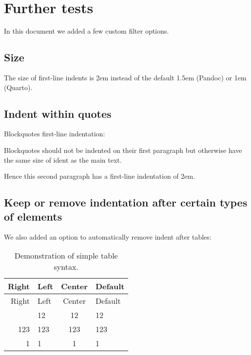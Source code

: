 \documentclass[
  letterpaper,
  DIV=11,
  numbers=noendperiod]{scrartcl}
\makeatletter
\renewenvironment{quote}
     {\list{}{\listparindent 1.5em%
              \itemindent \listparindent
              \rightmargin \leftmargin
              \parsep \z@ \@plus \p@}%
            \item\noindent\relax}
      {\endlist}
\makeatother
\begin{document}
\hypertarget{further-tests}{%
\section{Further tests}\label{further-tests}}

In this document we added a few custom filter options.

\hypertarget{size}{%
\subsection{Size}\label{size}}

The size of first-line indents is 2em instead of the default 1.5em
(Pandoc) or 1em (Quarto).

\hypertarget{indent-within-quotes}{%
\subsection{Indent within quotes}\label{indent-within-quotes}}

Blockquotes first-line indentation:

\begin{quote}
\noindent Blockquotes should not be indented on their first paragraph
but otherwise have the same size of ident as the main text.

Hence this second paragraph has a first-line indentation of 2em.
\end{quote}

\hypertarget{keep-or-remove-indentation-after-certain-types-of-elements}{%
\subsection{Keep or remove indentation after certain types of
elements}\label{keep-or-remove-indentation-after-certain-types-of-elements}}

We also added an option to automatically remove indent after tables:

\begin{longtable}[]{@{}rlcl@{}}
\caption{Demonstration of simple table syntax.}\tabularnewline
\toprule\noalign{}
Right & Left & Center & Default \\
\midrule\noalign{}
\endfirsthead
\toprule\noalign{}
Right & Left & Center & Default \\
\midrule\noalign{}
\endhead
\bottomrule\noalign{}
\endlastfoot
12 & 12 & 12 & 12 \\
123 & 123 & 123 & 123 \\
1 & 1 & 1 & 1 \\
\end{longtable}
\end{document}
